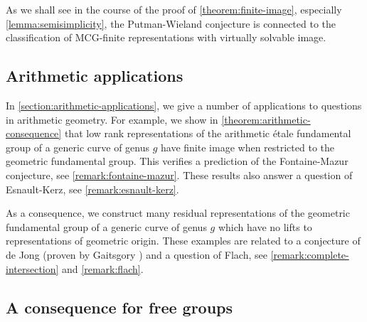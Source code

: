 As we shall see in the course of the proof of \autoref{theorem:finite-image},
especially \autoref{lemma:semisimplicity},
the Putman-Wieland conjecture is connected to the classification of MCG-finite representations with virtually solvable image.

\subsection{Arithmetic applications}
\label{subsection:arithmetic}
In \autoref{section:arithmetic-applications}, we give a number of applications
to questions in arithmetic geometry. For example, we show in
\autoref{theorem:arithmetic-consequence} that low rank representations of the
arithmetic \'etale fundamental group of a generic curve of genus $g$ have finite
image when restricted to the geometric fundamental group. This verifies a
prediction of the Fontaine-Mazur conjecture, see
\autoref{remark:fontaine-mazur}.
These results also answer a question of Esnault-Kerz, see \autoref{remark:esnault-kerz}.

As a consequence, we construct many residual
representations of the geometric fundamental group of a generic curve of genus
$g$ which have no lifts to representations of geometric origin. These examples are related to a conjecture of de Jong \cite{de2001conjecture} (proven by Gaitsgory \cite{gaitsgory2007jong}) and a question of Flach, see \autoref{remark:complete-intersection} and \autoref{remark:flach}.


\subsection{A consequence for free groups}
\label{subsection:free-groups}

